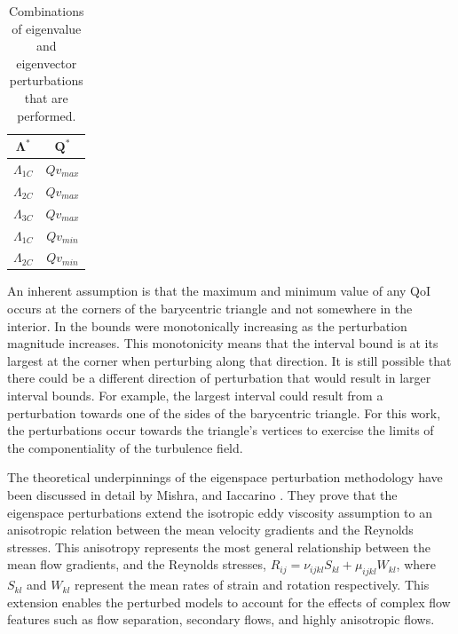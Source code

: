 \begin{table}
\centering
    \def\arraystretch{1.2}
    \begin{tabular}{c|c}
        $\mathbf{\Lambda^*}$ & $\mathbf{Q^*}$ \\\hline
        $\Lambda_{1C}$ & $Qv_{max}$\\
        $\Lambda_{2C}$ & $Qv_{max}$\\
        $\Lambda_{3C}$ & $Qv_{max}$\\
        $\Lambda_{1C}$ & $Qv_{min}$\\
        $\Lambda_{2C}$ & $Qv_{min}$\\
    \end{tabular}
    \caption{Combinations of eigenvalue and eigenvector perturbations that are performed.}
    \label{tab:perts}
\end{table}

An inherent assumption is that the maximum and minimum value of any QoI occurs at the corners of the barycentric triangle and not somewhere in the interior.
In \cite{emory2014visualizing} the bounds were monotonically increasing as the perturbation magnitude increases.
This monotonicity means that the interval bound is at its largest at the corner when perturbing along that direction.
It is still possible that there could be a different direction of perturbation that would result in larger interval bounds.
For example, the largest interval could result from a perturbation towards one of the sides of the barycentric triangle.
For this work, the perturbations occur towards the triangle's vertices to exercise the limits of the componentiality of the turbulence field. 

The theoretical underpinnings of the eigenspace perturbation methodology have been discussed in detail by Mishra, and Iaccarino \cite{mishra_perturbations_2019}.
They prove that the eigenspace perturbations extend the isotropic eddy viscosity assumption to an anisotropic relation between the mean velocity gradients and the Reynolds stresses.
This anisotropy represents the most general relationship between the mean flow gradients, and the Reynolds stresses, $ R_{ij}=\nu_{ijkl}S_{kl}+\mu_{ijkl}W_{kl}$, where $S_{kl}$ and $W_{kl}$ represent the mean rates of strain and rotation respectively.
This extension enables the perturbed models to account for the effects of complex flow features such as flow separation, secondary flows, and highly anisotropic flows. 

